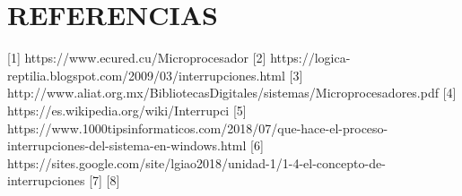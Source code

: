 \documentclass{article}
\begin{document}
\section{REFERENCIAS}
[1] https://www.ecured.cu/Microprocesador 
[2] https://logica-reptilia.blogspot.com/2009/03/interrupciones.html
[3] http://www.aliat.org.mx/BibliotecasDigitales/sistemas/Microprocesadores.pdf
[4] https://es.wikipedia.org/wiki/Interrupci%
[5] https://www.1000tipsinformaticos.com/2018/07/que-hace-el-proceso-interrupciones-del-sistema-en-windows.html 
[6] https://sites.google.com/site/lgiao2018/unidad-1/1-4-el-concepto-de-interrupciones
[7]
[8]
\end{document}
